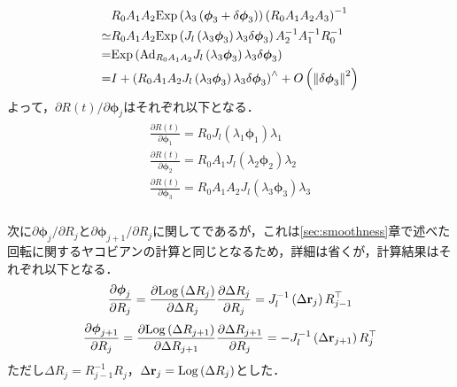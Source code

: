 %
\begin{align}
  \begin{split}
    & R_{0} A_{1} A_{2} {\rm Exp} \left( \lambda_{3} \left( \boldsymbol \phi_{3} + \delta \boldsymbol \phi_{3} \right) \right) \left( R_{0} A_{1} A_{2} A_{3} \right)^{-1} \\
    \simeq & R_{0} A_{1} A_{2} {\rm Exp} \left( J_{l} \left( \lambda_{3} \boldsymbol \phi_{3} \right) \lambda_{3} \delta \boldsymbol \phi_{3} \right) A_{2}^{-1} A_{1}^{-1} R_{0}^{-1} \\
    = & {\rm Exp} \left( {\rm Ad}_{R_{0} A_{1} A_{2} } J_{l} \left( \lambda_{3} \boldsymbol \phi_{3} \right) \lambda_{3} \delta \boldsymbol \phi_{3} \right) \\
    = & I + \left( R_{0} A_{1} A_{2} J_{l} \left( \lambda_{3} \boldsymbol \phi_{3} \right) \lambda_{3} \delta \boldsymbol \phi_{3} \right)^{\wedge} + O \left( \left\| \delta \boldsymbol \phi_{3} \right\|^{2} \right)
  \end{split}
\end{align}
%
よって，$\partial R(t) / \partial \boldsymbol \phi_{j}$はそれぞれ以下となる．
%
\begin{align}
  \begin{gathered}
    \frac{ \partial R(t) }{ \partial \boldsymbol \phi_{1} }
    =
    R_{0} J_{l} \left( \lambda_{1} \boldsymbol \phi_{1} \right) \lambda_{1} \\
    \frac{ \partial R(t) }{ \partial \boldsymbol \phi_{2} }
    =
    R_{0} A_{1} J_{l} \left( \lambda_{2} \boldsymbol \phi_{2} \right) \lambda_{2} \\
    \frac{ \partial R(t) }{ \partial \boldsymbol \phi_{3} }
    =
    R_{0} A_{1} A_{2} J_{l} \left( \lambda_{3} \boldsymbol \phi_{3} \right) \lambda_{3} \\
  \end{gathered}
\end{align}
%

次に$\partial \boldsymbol \phi_{j} / \partial R_{j}$と$\partial \boldsymbol \phi_{j+1} / \partial R_{j}$に関してであるが，これは\ref{sec:smoothness}章で述べた回転に関するヤコビアンの計算と同じとなるため，詳細は省くが，計算結果はそれぞれ以下となる．
%
\begin{align}
  \frac{ \partial \boldsymbol \phi_{j} }{ \partial R_{j} }
  =
  \frac{ \partial {\rm Log} \left( \Delta R_{j} \right) }{ \partial \Delta R_{j} }
  \frac{ \partial \Delta R_{j} }{ \partial R_{j} }
  =
  J_{l}^{-1} \left( \Delta {\bf r}_{j} \right) R_{j-1}^{\top}
\end{align}
%
\begin{align}
  \frac{ \partial \boldsymbol \phi_{j+1} }{ \partial R_{j} }
  =
  \frac{ \partial {\rm Log} \left( \Delta R_{j+1} \right) }{ \partial \Delta R_{j+1} }
  \frac{ \partial \Delta R_{j+1} }{ \partial R_{j} }
  =
  -J_{l}^{-1} \left( \Delta {\bf r}_{j+1} \right) R_{j}^{\top}
\end{align}
%
ただし$\Delta R_{j} = R_{j-1}^{-1} R_{j}$，$\Delta {\bf r}_{j} = {\rm Log} \left( \Delta R_{j} \right)$とした．

